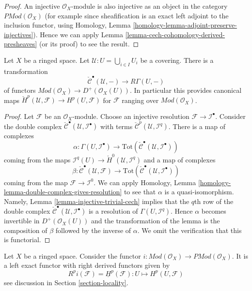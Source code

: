 \begin{proof}
An injective $\mathcal{O}_X$-module is also injective as an object in
the category $\textit{PMod}(\mathcal{O}_X)$ (for example since
sheafification is an exact left adjoint to the inclusion functor,
using Homology, Lemma \ref{homology-lemma-adjoint-preserve-injectives}).
Hence we can apply Lemma \ref{lemma-cech-cohomology-derived-presheaves}
(or its proof) to see the result.
\end{proof}

\begin{lemma}
\label{lemma-cech-cohomology}
Let $X$ be a ringed space.
Let $\mathcal{U} : U = \bigcup_{i \in I} U_i$ be a covering.
There is a transformation
$$
\check{\mathcal{C}}^\bullet(\mathcal{U}, -)
\longrightarrow
R\Gamma(U, -)
$$
of functors
$\textit{Mod}(\mathcal{O}_X) \to D^{+}(\mathcal{O}_X(U))$.
In particular this provides canonical maps
$\check{H}^p(\mathcal{U}, \mathcal{F}) \to H^p(U, \mathcal{F})$ for
$\mathcal{F}$ ranging over $\textit{Mod}(\mathcal{O}_X)$.
\end{lemma}

\begin{proof}
Let $\mathcal{F}$ be an $\mathcal{O}_X$-module. Choose an injective resolution
$\mathcal{F} \to \mathcal{I}^\bullet$. Consider the double complex
$\check{\mathcal{C}}^\bullet(\mathcal{U}, \mathcal{I}^\bullet)$ with terms
$\check{\mathcal{C}}^p(\mathcal{U}, \mathcal{I}^q)$.
There is a map of complexes
$$
\alpha :
\Gamma(U, \mathcal{I}^\bullet)
\longrightarrow
\text{Tot}(\check{\mathcal{C}}^\bullet(\mathcal{U}, \mathcal{I}^\bullet))
$$
coming from the maps
$\mathcal{I}^q(U) \to \check{H}^0(\mathcal{U}, \mathcal{I}^q)$
and a map of complexes
$$
\beta :
\check{\mathcal{C}}^\bullet(\mathcal{U}, \mathcal{F})
\longrightarrow
\text{Tot}(\check{\mathcal{C}}^\bullet(\mathcal{U}, \mathcal{I}^\bullet))
$$
coming from the map $\mathcal{F} \to \mathcal{I}^0$.
We can apply
Homology, Lemma \ref{homology-lemma-double-complex-gives-resolution}
to see that $\alpha$ is a quasi-isomorphism.
Namely, Lemma \ref{lemma-injective-trivial-cech} implies that
the $q$th row of the double complex
$\check{\mathcal{C}}^\bullet(\mathcal{U}, \mathcal{I}^\bullet)$ is a
resolution of $\Gamma(U, \mathcal{I}^q)$.
Hence $\alpha$ becomes invertible in $D^{+}(\mathcal{O}_X(U))$ and
the transformation of the lemma is the composition of $\beta$
followed by the inverse of $\alpha$. We omit the verification
that this is functorial.
\end{proof}

\begin{lemma}
\label{lemma-include}
Let $X$ be a ringed space.
Consider the functor
$i : \textit{Mod}(\mathcal{O}_X) \to \textit{PMod}(\mathcal{O}_X)$.
It is a left exact functor with right derived functors given by
$$
R^pi(\mathcal{F}) = \underline{H}^p(\mathcal{F}) :
U \longmapsto H^p(U, \mathcal{F})
$$
see discussion in Section \ref{section-locality}.
\end{lemma}

